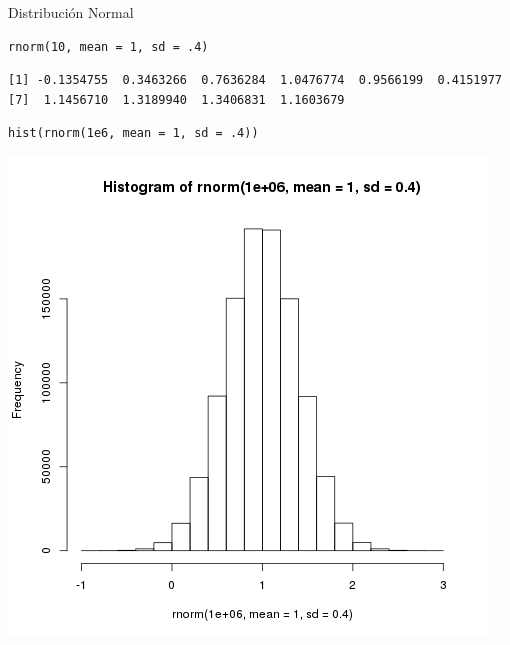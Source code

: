 \documentclass[xcolor={usenames,svgnames,dvipsnames}]{beamer}
\begin{document}
\begin{frame}[fragile,label=sec-3-3]{Distribución Normal}
 \lstset{language=R,label= ,caption= ,numbers=none}
\begin{lstlisting}
rnorm(10, mean = 1, sd = .4)
\end{lstlisting}

\begin{verbatim}
[1] -0.1354755  0.3463266  0.7636284  1.0476774  0.9566199  0.4151977
[7]  1.1456710  1.3189940  1.3406831  1.1603679
\end{verbatim}

\lstset{language=R,label= ,caption= ,numbers=none}
\begin{lstlisting}
hist(rnorm(1e6, mean = 1, sd = .4))
\end{lstlisting}

\includegraphics[height=0.6\textheight]{figs/rnorm.png}
\end{frame}
\end{document}
